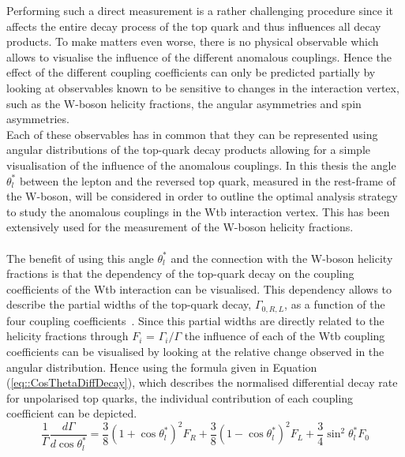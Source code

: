 Performing such a direct measurement is a rather challenging procedure since it affects the entire decay process of the top quark and thus influences all decay products.
To make matters even worse, there is no physical observable which allows to visualise the influence of the different anomalous couplings. 
Hence the effect of the different coupling coefficients can only be predicted partially by looking at observables known to be sensitive to changes in the interaction vertex, such as the W-boson helicity fractions, the angular asymmetries and spin asymmetries.
\\
Each of these observables has in common that they can be represented using angular distributions of the top-quark decay products allowing for a simple visualisation of the influence of the anomalous couplings. In this thesis the angle $\theta_{l}^{*}$ between the lepton and the reversed top quark, measured in the rest-frame of the W-boson, will be considered in order to outline the optimal analysis strategy to study the anomalous couplings in the Wtb interaction vertex.
This has been extensively used for the measurement of the W-boson helicity fractions.
\\
\\
The benefit of using this angle $\theta_{l}^{*}$ and the connection with the W-boson helicity fractions is that the dependency of the top-quark decay on the coupling coefficients of the Wtb interaction can be visualised. This dependency allows to describe the partial widths of the top-quark decay, $\Gamma_{0,R,L}$, as a function of the four coupling coefficients~\cite{WidthLinkWtb}.
Since this partial widths are directly related to the helicity fractions through $F_{i}$ = $\Gamma_{i}/\Gamma$ the influence of each of the Wtb coupling coefficients can be visualised by looking at the relative change observed in the angular distribution.
Hence using the formula given in Equation (\ref{eq::CosThetaDiffDecay}), which describes the normalised differential decay rate for unpolarised top quarks, the individual contribution of each coupling coefficient can be depicted. %
\begin{equation} \label{eq::CosThetaDiffDecay}
 \frac{1}{\Gamma} \frac{d\Gamma}{d\cos \theta_{l}^{*}} = \frac{3}{8} (1 + \cos \theta_{l}^{*})^{2} F_R +  \frac{3}{8} (1 - \cos \theta_{l}^{*})^{2} F_L + \frac{3}{4} \sin^{2} \theta_{l}^{*} F_0
\end{equation}

